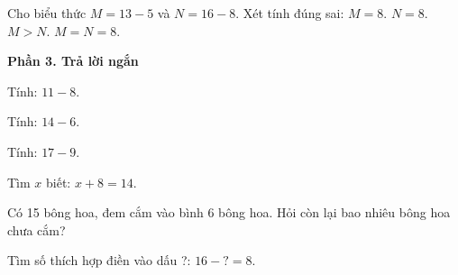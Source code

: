 \begin{ex} %
Cho biểu thức $M = 13 - 5$ và $N = 16 - 8$. Xét tính đúng sai:
\choiceTF
{\True $M = 8$.}
{\True $N = 8$.}
{$M > N$.}
{\True $M = N = 8$.}
\end{ex}

\textbf{Phần 3. Trả lời ngắn}

\begin{ex} %
Tính: $11 - 8$.
\end{ex}

\begin{ex} %
Tính: $14 - 6$.
\end{ex}

\begin{ex} %
Tính: $17 - 9$.
\end{ex}

\begin{ex} %
Tìm $x$ biết: $x + 8 = 14$.
\end{ex}

\begin{ex} %
Có 15 bông hoa, đem cắm vào bình 6 bông hoa. Hỏi còn lại bao nhiêu bông hoa chưa cắm?
\end{ex}

\begin{ex} %
Tìm số thích hợp điền vào dấu ?: $16 - ? = 8$.
\end{ex}
